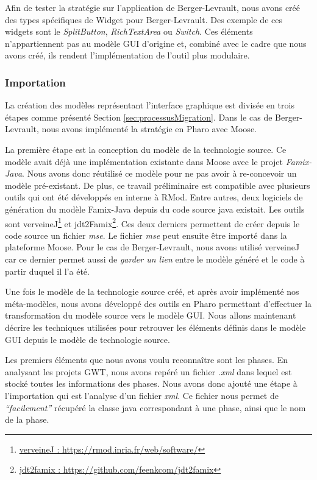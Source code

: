 \documentclass[11pt,]{article}
\begin{document}
Afin de tester la stratégie sur l'application de Berger-Levrault, nous
avons créé des types spécifiques de Widget pour Berger-Levrault. Des
exemple de ces widgets sont le \emph{SplitButton}, \emph{RichTextArea}
ou \emph{Switch}. Ces éléments n'appartiennent pas au modèle GUI
d'origine et, combiné avec le cadre que nous avons créé, ils rendent
l'implémentation de l'outil plus modulaire.

\hypertarget{importation}{%
\subsubsection{Importation}\label{importation}}

La création des modèles représentant l'interface graphique est divisée
en trois étapes comme présenté Section \ref{sec:processusMigration}.
Dans le cas de Berger-Levrault, nous avons implémenté la stratégie en
Pharo avec Moose.

La première étape est la conception du modèle de la technologie source.
Ce modèle avait déjà une implémentation existante dans Moose avec le
projet \emph{Famix-Java}. Nous avons donc réutilisé ce modèle pour ne
pas avoir à re-concevoir un modèle pré-existant. De plus, ce travail
préliminaire est compatible avec plusieurs outils qui ont été développés
en interne à RMod. Entre autres, deux logiciels de génération du modèle
Famix-Java depuis du code source java existait. Les outils sont
verveineJ\footnote{\href{https://rmod.inria.fr/web/software/}{verveineJ
  : https://rmod.inria.fr/web/software/}} et jdt2Famix\footnote{\href{https://github.com/feenkcom/jdt2famix}{jdt2famix
  : https://github.com/feenkcom/jdt2famix}}. Ces deux derniers
permettent de créer depuis le code source un fichier \emph{mse}. Le
fichier \emph{mse} peut ensuite être importé dans la plateforme Moose.
Pour le cas de Berger-Levrault, nous avons utilisé verveineJ car ce
dernier permet aussi de \emph{garder un lien} entre le modèle généré et
le code à partir duquel il l'a été.

Une fois le modèle de la technologie source créé, et après avoir
implémenté nos méta-modèles, nous avons développé des outils en Pharo
permettant d'effectuer la transformation du modèle source vers le modèle
GUI. Nous allons maintenant décrire les techniques utilisées pour
retrouver les éléments définis dans le modèle GUI depuis le modèle de
technologie source.

Les premiers éléments que nous avons voulu reconnaître sont les phases.
En analysant les projets GWT, nous avons repéré un fichier \emph{.xml}
dans lequel est stocké toutes les informations des phases. Nous avons
donc ajouté une étape à l'importation qui est l'analyse d'un fichier
\emph{xml}. Ce fichier nous permet de \emph{``facilement''} récupéré la
classe java correspondant à une phase, ainsi que le nom de la phase.
\end{document}
